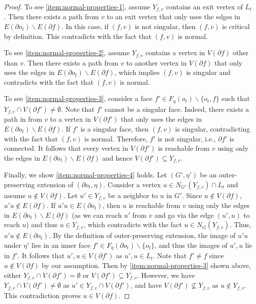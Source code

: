\documentclass[a4paper,11pt]{article}
\numberwithin{lemma}{section}
\begin{document}
\begin{proof}
To see \ref{item:normal-properties-1}, assume $Y_{f,v}$ contains an exit vertex of $L_t$.
Then there exists a path from $v$ to an exit vertex that only uses the edges in $E(\partial o_t) \backslash E(\partial f)$.
In this case, if $(f,v)$ is not singular, then $(f,v)$ is critical by definition.
This contradicts with the fact that $(f,v)$ is normal.

To see \ref{item:normal-properties-2}, assume $Y_{f,v}$ contains a vertex in $V(\partial f)$ other than $v$.
Then there exists a path from $v$ to another vertex in $V(\partial f)$ that only uses the edges in $E(\partial o_t) \backslash E(\partial f)$, which implies $(f,v)$ is singular and contradicts with the fact that $(f,v)$ is normal.

To see \ref{item:normal-properties-3}, consider a face $f' \in F_\eta(o_t) \backslash \{o_t,f\}$ such that $Y_{f,v} \cap V(\partial f') \neq \emptyset$.
Note that $f'$ cannot be a singular face.
Indeed, there exists a path in from $v$ to a vertex in $V(\partial f')$ that only uses the edges in $E(\partial o_t) \backslash E(\partial f)$.
If $f'$ is a singular face, then $(f,v)$ is singular, contradicting with the fact that $(f,v)$ is normal.
Therefore, $f'$ is not singular, i.e., $\partial f'$ is connected.
It follows that every vertex in $V(\partial f')$ is reachable from $v$ using only the edges in $E(\partial o_t) \backslash E(\partial f)$ and hence $V(\partial f') \subseteq Y_{f,v}$.

Finally, we show \ref{item:normal-properties-4} holds.
Let $(G',\eta')$ be an outer-preserving extension of $(\partial o_t,\eta)$.
Consider a vertex $u \in N_{G'}(Y_{f,v}) \cap L_t$ and assume $u \notin V(\partial f)$.
Let $u' \in Y_{f,v}$ be a neighbor to $u$ in $G'$.
Since $u \notin V(\partial f)$, $u'u \notin E(\partial f)$.
If $u'u \in E(\partial o_t)$, then $u$ is reachable from $v$ using only the edges in $E(\partial o_t) \backslash E(\partial f)$ (as we can reach $u'$ from $v$ and go via the edge $(u',u)$ to reach $u$) and thus $u \in Y_{f,v}$, which contradicts with the fact $u \in N_G(Y_{f,v})$.
Thus, $u'u \notin E(\partial o_t)$.
By the definition of outer-preserving extension, the image of $u'u$ under $\eta'$ lies in an inner face $f' \in F_\eta(\partial o_t) \backslash \{o_t\}$, and thus the images of $u',u$ lie in $f'$.
It follows that $u',u \in V(\partial f')$ as $u',u \in L_t$.
Note that $f' \neq f$ since $u \notin V(\partial f)$ by our assumption.
Then by \ref{item:normal-properties-3} shown above, either $Y_{f,v} \cap V(\partial f') = \emptyset$ or $V(\partial f') \subseteq Y_{f,v}$.
However, we have $Y_{f,v} \cap V(\partial f') \neq \emptyset$ as $u' \in Y_{f,v} \cap V(\partial f')$, and have $V(\partial f') \nsubseteq Y_{f,v}$ as $u \notin Y_{f,v}$.
This contradiction proves $u \in V(\partial f)$.


\end{proof}
\end{document}
